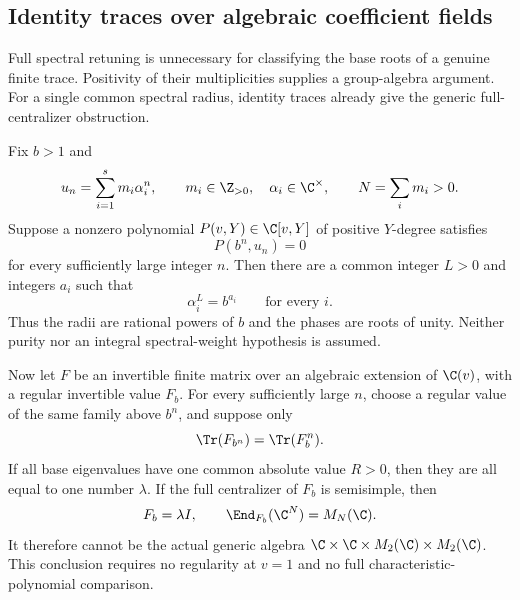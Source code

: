 \subsection{Identity traces over algebraic coefficient fields}
Full spectral retuning is unnecessary for classifying the
base roots of a genuine finite trace. Positivity of their
multiplicities supplies a group-algebra argument. For a
single common spectral radius, identity traces already
give the generic full-centralizer obstruction.

\begin{finding}
\label{f:algebraicgenuinetrace}
Fix $b>1$ and
\[
 u_n=\sum_{i=1}^s m_i\alpha_i^n,\qquad
 m_i\in\Z_{>0},\quad \alpha_i\in\C^\times,\qquad
 N=\sum_i m_i>0.
\]
Suppose a nonzero polynomial $P(v,Y)\in\C[v,Y]$
of positive $Y$-degree satisfies
\begin{equation}\label{eq:genuinetracealgebraic}
 P(b^n,u_n)=0
\end{equation}
for every sufficiently large integer $n$.
Then there are a common integer $L>0$ and integers
$a_i$ such that
\begin{equation}\label{eq:genuinetracepowers}
 \alpha_i^L=b^{a_i}\qquad\text{for every }i.
\end{equation}
Thus the radii are rational powers of $b$ and the phases
are roots of unity. Neither purity nor an integral
spectral-weight hypothesis is assumed.

Now let $F$ be an invertible finite matrix over an algebraic
extension of $\C(v)$, with a regular invertible value $F_b$.
For every sufficiently large $n$, choose a regular value
of the same family above $b^n$, and suppose only
\begin{equation}\label{eq:genuineidentityretuning}
 \Tr(F_{b^n})=\Tr(F_b^n).
\end{equation}
If all base eigenvalues have one common absolute value
$R>0$, then they are all equal to one number $\lambda$.
If the full centralizer of $F_b$ is semisimple, then
\[
 F_b=\lambda I,\qquad
 \End_{F_b}(\C^N)=M_N(\C).
\]
It therefore cannot be the actual generic algebra
$\C\times\C\times M_2(\C)\times M_2(\C)$.
This conclusion requires no regularity at $v=1$ and
no full characteristic-polynomial comparison.
\end{finding}


